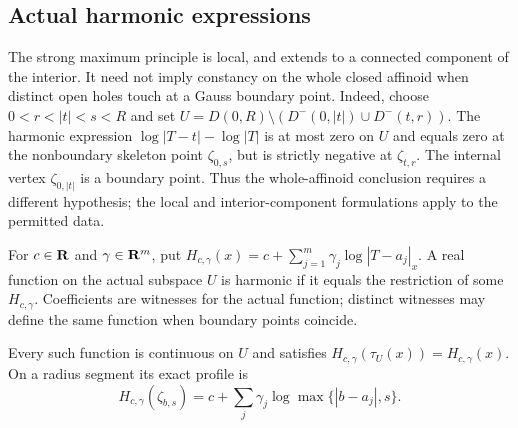 \subsection{Actual harmonic expressions}\label{subsec:fc-line-harmonic}

\begin{remark}\label{rmk:fc-harmonic-touching}
The strong maximum principle is local, and extends to a connected component
of the interior. It need not imply constancy on the whole closed affinoid
when distinct open holes touch at a Gauss boundary point. Indeed, choose
$0<r<|t|<s<R$ and set
$U=D(0,R)\setminus(D^-(0,|t|)\cup D^-(t,r))$.
The harmonic expression $\log|T-t|-\log|T|$ is at most zero on $U$ and
equals zero at the nonboundary skeleton point $\zeta_{0,s}$, but is strictly
negative at $\zeta_{t,r}$. The internal vertex $\zeta_{0,|t|}$ is a boundary
point. Thus the whole-affinoid conclusion requires a different hypothesis;
the local and interior-component formulations apply to the permitted data.
\end{remark}

\begin{definition}\label{def:fc-actual-harmonic}
\leanok
{}
For $c\in\mathbf{R}$ and $\gamma\in\mathbf{R}^m$, put
$H_{c,\gamma}(x)=c+\sum_{j=1}^m\gamma_j\log|T-a_j|_x$.
A real function on the actual subspace $U$ is harmonic if it equals the
restriction of some $H_{c,\gamma}$. Coefficients are witnesses for the
actual function; distinct witnesses may define the same function when
boundary points coincide.
\end{definition}

\begin{lemma}\label{lem:fc-harmonic-retraction}
\leanok
{}
Every such function is continuous on $U$ and satisfies
$H_{c,\gamma}(\tau_U(x))=H_{c,\gamma}(x)$.
On a radius segment its exact profile is
\[
 H_{c,\gamma}(\zeta_{b,s})=
 c+\sum_j\gamma_j\log\max\{|b-a_j|,s\}.
\]
\end{lemma}

